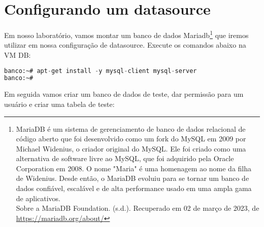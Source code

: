 \section{Configurando um datasource}

Em nosso laboratório, vamos montar um banco de dados Mariadb\footnote{MariaDB é um sistema de gerenciamento de banco de dados relacional de código aberto que foi desenvolvido como um fork do MySQL em 2009 por Michael Widenius, o criador original do MySQL. Ele foi criado como uma alternativa de software livre ao MySQL, que foi adquirido pela Oracle Corporation em 2008. O nome "Maria" é uma homenagem ao nome da filha de Widenius. Desde então, o MariaDB evoluiu para se tornar um banco de dados confiável, escalável e de alta performance usado em uma ampla gama de aplicativos.\\Sobre a MariaDB Foundation. (s.d.). Recuperado em 02 de março de 2023, de \url{https://mariadb.org/about/}} que iremos utilizar em nossa configuração de datasource. Execute os comandos abaixo na VM DB:

\hypertarget{instalandoMariDB}{}
\begin{lstlisting}[language=sql,breaklines=true,basicstyle=\ttfamily, 
label=cinstalandoMariDB0 ,
breaklines=true,caption=\firacoderetina Instalando Mariadb, 
postbreak=\mbox{\textcolor{red}{$\hookrightarrow$}\space},
showstringspaces=false]
banco:~# apt-get install -y mysql-client mysql-server
banco:~#
\end{lstlisting}

Em seguida vamos criar um banco de dados de teste, dar permissão para um usuário e criar uma tabela de teste:

